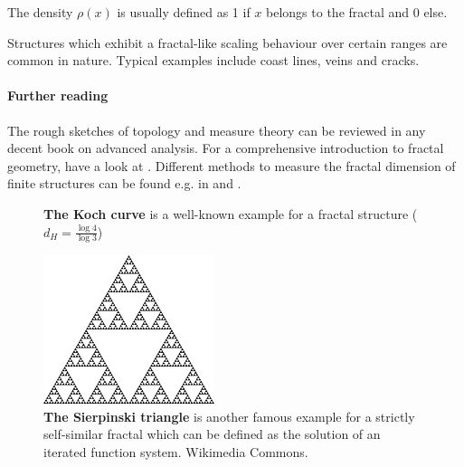 \documentclass[twocolumn,10pt]{scrartcl}
\begin{document}
            The density $\rho(x)$ is usually defined as 1 if $x$ belongs to the fractal and 0 else.

            Structures which exhibit a fractal-like scaling behaviour over certain ranges are common in nature. Typical
            examples include coast lines, veins and cracks.

        {\small
            \paragraph{Further reading}
            The rough sketches of topology and measure theory can be reviewed in any decent book on advanced analysis.
            For a comprehensive introduction to fractal geometry, have a look at \cite{src-mandelbrot}. Different
            methods to measure the fractal dimension of finite structures can be found e.g. in \cite{src-stanley} and
            \cite{src-wittensander}.
        }

        \begin{figure}
            \center
            \caption[The Koch curve]
                {\small\textbf{The Koch curve} is a well-known example for a fractal structure ($d_H=\frac{\log 4}
                    {\log 3}$)}
            \label{fig-koch}
        \end{figure}

        \begin{figure}
            \center
            \includegraphics[width=5cm]{img/sierpinski.png}
            \caption[The Sierpinski triangle]
                {\small\textbf{The Sierpinski triangle} is another famous example for a strictly self-similar fractal
                which can be defined as the solution of an iterated function system. Wikimedia Commons.}
            \label{fig-sierpinski}
        \end{figure}
\end{document}
